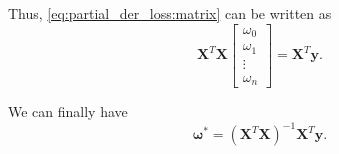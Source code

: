 \documentclass[10pt,a4paper]{article}
\begin{document}
Thus, \eqref{eq:partial_der_loss:matrix} can be written as
\begin{equation}
\mathbf{X}^{T} \mathbf{X} 
\begin{bmatrix}
\omega_{0} \\ 
\omega_{1} \\
\vdots \\
\omega_{n}  
\end{bmatrix}
 = \mathbf{X}^{T} \mathbf{y}.
\end{equation}

We can finally have
\begin{equation}
\boldsymbol{\omega}^{*} = ( \mathbf{X}^{T} \mathbf{X} )^{-1} \mathbf{X}^{T} \mathbf{y} .
\end{equation}
\end{document}
